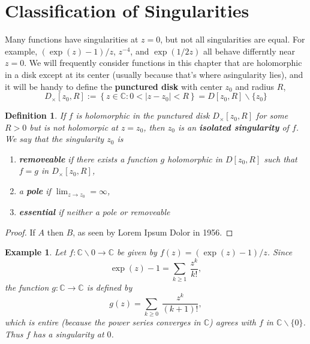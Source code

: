 \documentclass{article}
\theoremstyle{accentcolorthm}
\newtheorem{cdef}{Definition}[section]
\theoremstyle{accentcolorthm}
\newtheorem{cexamp}{Example}[section]
\begin{document}
\section{Classification of Singularities}

Many functions have singularities at $z=0$, but not all singularities are equal.
For example, $(\exp(z)-1)/z$, $z^{-4}$, and $\exp({1/2z})$ all behave differntly
near $z=0$.
We will frequently consider functions in this chapter that are holomorphic in a
disk except at its center (usually because that’s where asingularity lies), and
it will be handy to define the \textbf{punctured disk} with center $z_0$ and radius $R$,
\[ D_\times [z_0, R] := \left\{ z \in \mathbb{C}  : 0 < |z-z_0| < R\right\}  = D[z_0,R] \backslash \{z_0\} \]


\begin{cdef} 
	If $f$ is holomorphic in the punctured disk $D_\times[z_0, R]$ for some $R>0$
	but is not holomorpic at $z=z_0$, then $z_0$ is an
	\textbf{isolated singularity} of $f$. We say that the singularity $z_0$ is
	\begin{enumerate}[label=(\alph*)]
		\item \textbf{removeable} if there exists a function $g$ holomorphic in $D[z_0,R]$
			such that $f=g$ in $D_\times[z_0, R]$, 
		\item a \textbf{pole} if $\displaystyle\lim_{z\to z_0} = \infty$, 
		\item \textbf{essential} if neither a pole or removeable
\end{enumerate}
\end{cdef}
\begin{proof}
	If $A$ then $B$, as seen by Lorem Ipsum Dolor in 1956.
\end{proof}


\begin{cexamp}\label{ex:powers}
	Let $f: \mathbb{C} \backslash {0} \to \mathbb{C}$ be given by $f(z) = (\exp(z)-1)/z$.
	Since 
	\[ \exp(z)-1 = \sum_{k\geq 1}\  \frac{z^k}{k!}, \]
	the function $g:\mathbb{C} \to \mathbb{C}$ is defined by
	\[ g(z) = \sum_{k\geq 0}\  \frac{z^k}{(k+1)!}, \]
	which is entire (because the power series converges in $\mathbb{C}$) agrees with $f$ in
	$\mathbb{C}\backslash \{0\}$. Thus $f$ has a singularity at $0$.

\end{cexamp}
\end{document}
